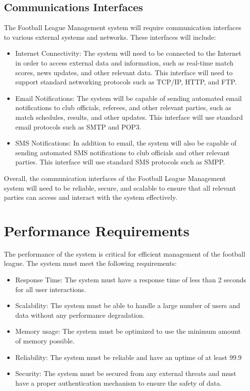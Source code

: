 \documentclass[12pt]{article}
\begin{document}
\subsection{Communications Interfaces}
The Football League Management system will require communication interfaces to various external systems and networks. These interfaces will include:
\begin{itemize}
    \item Internet Connectivity: The system will need to be connected to the Internet in order to access external data and information, such as real-time match scores, news updates, and other relevant data. This interface will need to support standard networking protocols such as TCP/IP, HTTP, and FTP.

    \item Email Notifications: The system will be capable of sending automated email notifications to club officials, referees, and other relevant parties, such as match schedules, results, and other updates. This interface will use standard email protocols such as SMTP and POP3.

    \item SMS Notifications: In addition to email, the system will also be capable of sending automated SMS notifications to club officials and other relevant parties. This interface will use standard SMS protocols such as SMPP.
\end{itemize}
Overall, the communication interfaces of the Football League Management system will need to be reliable, secure, and scalable to ensure that all relevant parties can access and interact with the system effectively.

\section{Performance Requirements}
The performance of the system is critical for efficient management of the football league. The system must meet the following requirements:
\begin{itemize}
    \item Response Time: The system must have a response time of less than 2 seconds for all user interactions.

    \item Scalability: The system must be able to handle a large number of users and data without any performance degradation.

    \item Memory usage: The system must be optimized to use the minimum amount of memory possible.

    \item Reliability: The system must be reliable and have an uptime of at least 99.9%

    \item Security: The system must be secured from any external threats and must have a proper authentication mechanism to ensure the safety of data.
\end{itemize}
\end{document}

